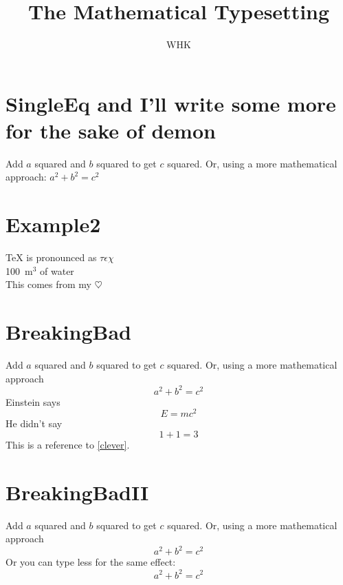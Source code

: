 \documentclass[a4paper, 12pt]{article}
\author{WHK}
\title{The Mathematical Typesetting}
\begin{document}
\maketitle
\tableofcontents

\section[SingleLiners]{SingleEq and I'll write some more for the sake of demon}
Add $a$ squared and $b$ squared to get $c$ squared. %
Or, using a more mathematical approach: $a^2 + b^2 = c^2$

\section[AnotherSingleLiners]{Example2}
\TeX{} is pronounced as $\tau\epsilon\chi$\\
100~m$^{3}$ of water\\ %
This comes from my $\heartsuit$

\section{BreakingBad}
Add $a$ squared and $b$ squared to get $c$ squared. %
Or, using a more mathematical approach
\begin{equation}
  a^2 + b^2 = c^2
  \label{3.1} %
  \tag{3.1} %
\end{equation} %
Einstein says
\begin{equation}
  E = mc^2
  \tag{3.2}
  \label{clever}
\end{equation}
He didn't say
\begin{equation}
  1 + 1 = 3
  \tag{dumb}
\end{equation} %
This is a reference to \eqref{clever}.

\section{BreakingBadII}
Add $a$ squared and $b$ squared to get $c$ squared. %
Or, using a more mathematical approach
\[ a^2 + b^2 = c^2 \] %
Or you can type less for the same effect:
\begin{equation*}
  a^2 + b^2 = c^2
\end{equation*}
\end{document}
